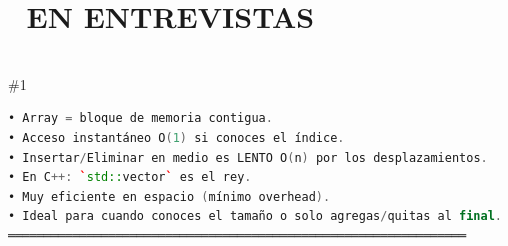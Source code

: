 \documentclass{article}
\newcommand{\entrevistas}[1]{
    \section*{🎯 EN ENTREVISTAS}
    \hrulefill \\
    \#1
}
\begin{document}
\entrevistas{
✅ Arrays son la estructura de datos más común en entrevistas. Domínalos.

💡 Patrones clave:
   - "Two Pointers": Usar un índice al inicio y otro al final.
   - "Sliding Window": Una ventana que se desliza para encontrar subarrays.
   - "Prefix Sum": Pre-calcular sumas para responder rangos en O(1).

⚠️ Off-by-one errors: El error más común es salirte del rango (acceder
   a arr[n] cuando el tamaño es n). Siempre usa `i < n`.

🔑 Pregunta clave: "¿El array está ordenado?". Si está ordenado, casi
   siempre la respuesta involucra Binary Search O(log n).
}

\begin{lstlisting}[language=C++]
• Array = bloque de memoria contigua.
• Acceso instantáneo O(1) si conoces el índice.
• Insertar/Eliminar en medio es LENTO O(n) por los desplazamientos.
• En C++: `std::vector` es el rey.
• Muy eficiente en espacio (mínimo overhead).
• Ideal para cuando conoces el tamaño o solo agregas/quitas al final.
════════════════════════════════════════════════════════════════
\end{lstlisting}
\end{document}
